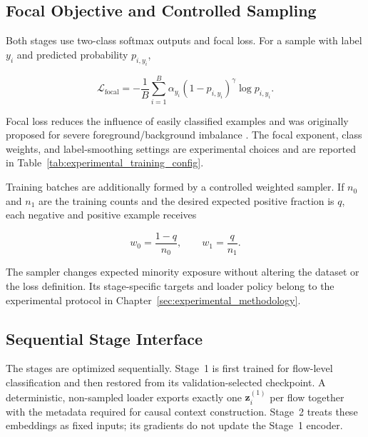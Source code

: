 \documentclass[11pt,fleqn]{report}
\begin{document}
\subsection{Focal Objective and Controlled Sampling}
\label{subsubsec:focal_training}

Both stages use two-class softmax outputs and focal loss. For a sample with
label $y_i$ and predicted probability $p_{i,y_i}$,

\begin{equation}
    \mathcal{L}_{\mathrm{focal}}
    =-\frac{1}{B}
      \sum_{i=1}^{B}
      \alpha_{y_i}
      \left(1-p_{i,y_i}\right)^{\gamma}
      \log p_{i,y_i}.
    \label{eq:method_focal_loss}
\end{equation}

Focal loss reduces the influence of easily classified examples and was
originally proposed for severe foreground/background imbalance
\cite{Lin2017FocalLoss}. The focal exponent, class weights, and label-smoothing
settings are experimental choices and are reported in
Table~\ref{tab:experimental_training_config}.

Training batches are additionally formed by a controlled weighted sampler. If
$n_0$ and $n_1$ are the training counts and the desired expected positive
fraction is $q$, each negative and positive example receives

\begin{equation}
    w_0=\frac{1-q}{n_0},
    \qquad
    w_1=\frac{q}{n_1}.
    \label{eq:controlled_sampler}
\end{equation}

The sampler changes expected minority exposure without altering the dataset or
the loss definition. Its stage-specific targets and loader policy belong to the
experimental protocol in Chapter~\ref{sec:experimental_methodology}.

\subsection{Sequential Stage Interface}
\label{subsec:sequential_stage_interface}

The stages are optimized sequentially. Stage~1 is first trained for flow-level
classification and then restored from its validation-selected checkpoint. A
deterministic, non-sampled loader exports exactly one
$\mathbf{z}^{(1)}_i$ per flow together with the metadata required for causal
context construction. Stage~2 treats these embeddings as fixed inputs; its
gradients do not update the Stage~1 encoder.
\end{document}
